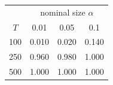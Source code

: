 % 
\begin{tabular}{cccc}
  \hline
  & \multicolumn{3}{c}{nominal size $\alpha$} \\
 $T$ & 0.01 & 0.05 & 0.1 \\
 \hline
100 & 0.010 & 0.020 & 0.140 \\ 
  250 & 0.960 & 0.980 & 1.000 \\ 
  500 & 1.000 & 1.000 & 1.000 \\ 
   \hline
\end{tabular}
